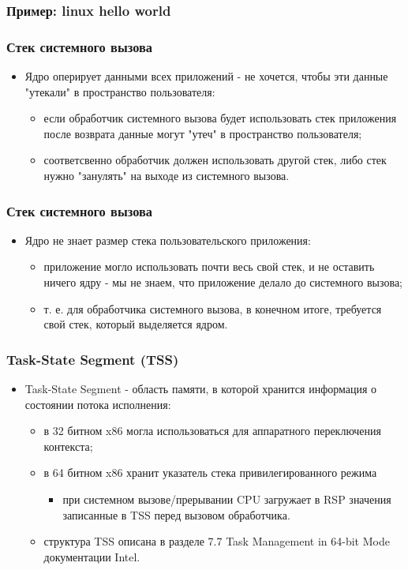 \begin{frame}[fragile]
\frametitle{Пример: linux hello world}

\end{frame}

\begin{frame}
\frametitle{Стек системного вызова}
\begin{itemize}
  \item Ядро оперирует данными всех приложений - не хочется, чтобы эти данные
  "утекали" в пространство пользователя:
  \begin{itemize}
    \item если обработчик системного вызова будет использовать стек приложения
    после возврата данные могут "утеч" в пространство пользователя;
    \item соответсвенно обработчик должен использовать другой стек, либо стек
    нужно "занулять" на выходе из системного вызова.
  \end{itemize}
\end{itemize}
\end{frame}

\begin{frame}
\frametitle{Стек системного вызова}
\begin{itemize}
  \item Ядро не знает размер стека пользовательского приложения:
  \begin{itemize}
    \item приложение могло использовать почти весь свой стек, и не оставить
    ничего ядру - мы не знаем, что приложение делало до системного вызова;
    \item т. е. для обработчика системного вызова, в конечном итоге, требуется
    свой стек, который выделяется ядром.
  \end{itemize}
\end{itemize}
\end{frame}

\begin{frame}
\frametitle{Task-State Segment (TSS)}
\begin{itemize}
  \item Task-State Segment - область памяти, в которой хранится информация о
  состоянии потока исполнения:
  \begin{itemize}
    \item в 32 битном x86 могла использоваться для аппаратного переключения
    контекста;
    \item в 64 битном x86 хранит указатель стека привилегированного режима
    \begin{itemize}
      \item при системном вызове/прерывании CPU загружает в RSP значения
      записанные в TSS перед вызовом обработчика.
    \end{itemize}
    \item структура TSS описана в разделе 7.7 Task Management in 64-bit Mode
    документации Intel.
  \end{itemize}
\end{itemize}
\end{frame}

